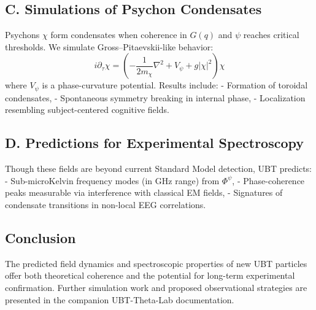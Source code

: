\subsection*{C. Simulations of Psychon Condensates}
Psychons $\chi$ form condensates when coherence in $G(q)$ and $\psi$ reaches critical thresholds. We simulate Gross–Pitaevskii-like behavior:
\[
i\partial_\tau \chi = \left( -\frac{1}{2m_\chi} \nabla^2 + V_\psi + g|\chi|^2 \right)\chi
\]
where $V_\psi$ is a phase-curvature potential. Results include:
- Formation of toroidal condensates,
- Spontaneous symmetry breaking in internal phase,
- Localization resembling subject-centered cognitive fields.

\subsection*{D. Predictions for Experimental Spectroscopy}
Though these fields are beyond current Standard Model detection, UBT predicts:
- Sub-microKelvin frequency modes (in GHz range) from $\Phi^\psi$,
- Phase-coherence peaks measurable via interference with classical EM fields,
- Signatures of condensate transitions in non-local EEG correlations.

\subsection*{Conclusion}
The predicted field dynamics and spectroscopic properties of new UBT particles offer both theoretical coherence and the potential for long-term experimental confirmation. Further simulation work and proposed observational strategies are presented in the companion UBT-Theta-Lab documentation.
